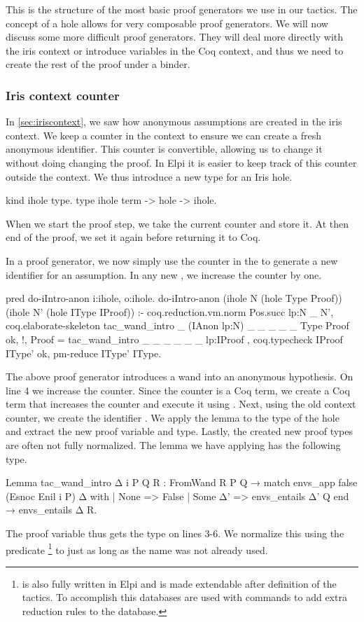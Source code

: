 \documentclass[thesis.tex]{subfiles}
\begin{document}
{{{{This is the structure of the most basic proof generators we use in our tactics. The concept of a hole allows for very composable proof generators. We will now discuss some more difficult proof generators. They will deal more directly with the iris context or introduce variables in the Coq context, and thus we need to create the rest of the proof under a binder.

\subsubsection{Iris context counter}\label{ssec:cecontextcounter}
In \cref{sec:iriscontext}, we saw how anonymous assumptions are created in the iris context. We keep a counter in the context to ensure we can create a fresh anonymous identifier. This counter is convertible, allowing us to change it without doing changing the proof. In Elpi it is easier to keep track of this counter outside the context. We thus introduce a new type for an Iris hole.
\begin{elpicode}
  kind ihole type.
  type ihole term -> hole -> ihole. %
\end{elpicode}
When we start the proof step, we take the current counter and store it. At then end of the proof, we set it again before returning it to Coq.

In a proof generator, we now simply use the counter in the  to generate a new identifier for an assumption. In any new , we increase the counter by one.
\begin{elpicode}
  pred do-iIntro-anon i:ihole, o:ihole.
  do-iIntro-anon (ihole N (hole Type Proof)) 
                 (ihole N' (hole IType IProof)) :-
    coq.reduction.vm.norm {{ Pos.succ lp:N }} _ N',
    coq.elaborate-skeleton 
      {{ tac_wand_intro _ (IAnon lp:N) _ _ _ _ _ }} 
      Type Proof ok, !,
    Proof = {{ tac_wand_intro _ _ _ _ _ _ lp:IProof }}, 
    coq.typecheck IProof IType' ok,
    pm-reduce IType' IType.
\end{elpicode}
The above proof generator introduces a wand into an anonymous hypothesis. On line 4 we increase the counter. Since the counter is a Coq term, we create a Coq term that increases the counter and execute it using . Next, using the old context counter, we create the identifier . We apply the lemma to the type of the hole and extract the new proof variable and type. Lastly, the created new proof types are often not fully normalized. The lemma we have applying has the following type.
\begin{coqcode}
  Lemma tac_wand_intro Δ i P Q R :
    FromWand R P Q →
    match envs_app false (Esnoc Enil i P) Δ with
    | None => False
    | Some Δ' => envs_entails Δ' Q
    end →
    envs_entails Δ R.
\end{coqcode}
The proof variable thus gets the type on lines 3-6. We normalize this using the predicate \footnote{ is also fully written in Elpi and is made extendable after definition of the tactics. To accomplish this \ce databases are used with commands to add extra reduction rules to the database.} to just  as long as the name was not already used.


}}}}
\end{document}
